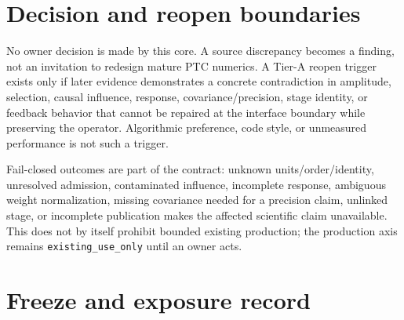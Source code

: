 \documentclass[11pt]{article}
\begin{document}
\section{Decision and reopen boundaries}

No owner decision is made by this core.  A source discrepancy becomes a
finding, not an invitation to redesign mature PTC numerics.  A Tier-A reopen
trigger exists only if later evidence demonstrates a concrete contradiction
in amplitude, selection, causal influence, response, covariance/precision,
stage identity, or feedback behavior that cannot be repaired at the interface
boundary while preserving the operator.  Algorithmic preference, code style,
or unmeasured performance is not such a trigger.

Fail-closed outcomes are part of the contract: unknown units/order/identity,
unresolved admission, contaminated influence, incomplete response, ambiguous
weight normalization, missing covariance needed for a precision claim,
unlinked stage, or incomplete publication makes the affected scientific claim
unavailable.  This does not by itself prohibit bounded existing production;
the production axis remains \texttt{existing\_use\_only} until an owner acts.

\section{Freeze and exposure record}
\label{sec:freeze}
\end{document}
